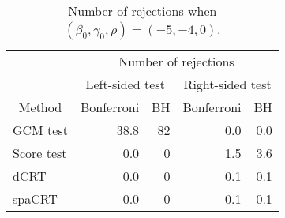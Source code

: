 \begin{table}[!h]
\centering
\caption{\label{tab:simulation_rejection_beta_-5_gamma_-4}Number of rejections when $(\beta_0,\gamma_0,\rho) = (-5, -4, 0)$.}
\centering
\begin{tabular}[t]{lrrrr}
\toprule
\multicolumn{1}{c}{ } & \multicolumn{4}{c}{Number of rejections} \\
\cmidrule(l{3pt}r{3pt}){2-5}
\multicolumn{1}{c}{ } & \multicolumn{2}{c}{Left-sided test} & \multicolumn{2}{c}{Right-sided test} \\
\cmidrule(l{3pt}r{3pt}){2-3} \cmidrule(l{3pt}r{3pt}){4-5}
\multicolumn{1}{c}{Method} & \multicolumn{1}{c}{Bonferroni} & \multicolumn{1}{c}{BH} & \multicolumn{1}{c}{Bonferroni} & \multicolumn{1}{c}{BH} \\
\cmidrule(l{3pt}r{3pt}){1-1} \cmidrule(l{3pt}r{3pt}){2-2} \cmidrule(l{3pt}r{3pt}){3-3} \cmidrule(l{3pt}r{3pt}){4-4} \cmidrule(l{3pt}r{3pt}){5-5}
GCM test & 38.8 & 82 & 0.0 & 0.0\\
Score test & 0.0 & 0 & 1.5 & 3.6\\
dCRT & 0.0 & 0 & 0.1 & 0.1\\
spaCRT & 0.0 & 0 & 0.1 & 0.1\\
\bottomrule
\end{tabular}
\end{table}
